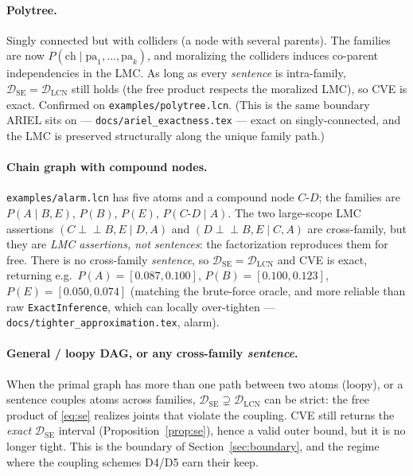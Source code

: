 \documentclass[11pt]{article}
\newcommand{\indep}{\perp\!\!\!\perp}
\newcommand{\DSE}{\mathcal{D}_{\mathrm{SE}}}
\newcommand{\DLCN}{\mathcal{D}_{\mathrm{LCN}}}
\begin{document}
\paragraph{Polytree.} Singly connected but with colliders (a node with several parents). The
families are now $P(\mathrm{ch}\mid\mathrm{pa}_1,\dots,\mathrm{pa}_k)$, and moralizing the colliders
induces co-parent independencies in the LMC. As long as every \emph{sentence} is intra-family,
$\DSE=\DLCN$ still holds (the free product respects the moralized LMC), so CVE is exact. Confirmed on
\texttt{examples/polytree.lcn}. (This is the same boundary ARIEL sits on ---
\texttt{docs/ariel\_exactness.tex} --- exact on singly-connected, and the LMC is preserved
structurally along the unique family path.)

\paragraph{Chain graph with compound nodes.} \texttt{examples/alarm.lcn} has five atoms and a
compound node $C\text{-}D$; the families are $P(A\mid B,E)$, $P(B)$, $P(E)$, $P(C\text{-}D\mid A)$.
The two large-scope LMC assertions $(C\indep B,E\mid D,A)$ and $(D\indep B,E\mid C,A)$ are
cross-family, but they are \emph{LMC assertions, not sentences}: the factorization reproduces them
for free. There is no cross-family \emph{sentence}, so $\DSE=\DLCN$ and CVE is exact, returning e.g.\
$P(A)=[0.087,0.100]$, $P(B)=[0.100,0.123]$, $P(E)=[0.050,0.074]$ (matching the brute-force oracle,
and more reliable than raw \texttt{ExactInference}, which can locally over-tighten ---
\texttt{docs/tighter\_approximation.tex}, alarm).

\paragraph{General / loopy DAG, or any cross-family \emph{sentence}.} When the primal graph has more
than one path between two atoms (loopy), or a sentence couples atoms across families, $\DSE\supsetneq
\DLCN$ can be strict: the free product of \eqref{eq:se} realizes joints that violate the coupling.
CVE still returns the \emph{exact} $\DSE$ interval (Proposition~\ref{prop:se}), hence a valid outer
bound, but it is no longer tight. This is the boundary of Section~\ref{sec:boundary}, and the regime
where the coupling schemes D4/D5 earn their keep.
\end{document}
